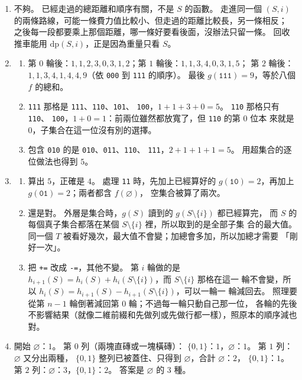 \begin{enumerate}
\item 不夠。 已經走過的總距離和順序有關，不是 $S$ 的函數。 走進同一個
$(S, i)$ 的兩條路線，可能一條費力值比較小、但走過的距離比較長，另一條相反；
之後每一段都要乘上那個距離，哪一條好要看後面，沒辦法只留一條。 回收推車能用
$\mathrm{dp}(S, i)$，正是因為重量只看 $S$。

\item
\begin{enumerate}
\item 第 $0$ 輪後：$1, 1, 2, 3, 0, 3, 1, 2$；第 $1$ 輪後：$1, 1, 3, 4, 0, 3, 1, 5$；
第 $2$ 輪後：$1, 1, 3, 4, 1, 4, 4, 9$（依 \texttt{000} 到 \texttt{111} 的順序）。
最後 $g(\texttt{111}) = 9$，等於八個 $f$ 的總和。
\item \texttt{111} 那格是 \texttt{111}、\texttt{110}、\texttt{101}、
\texttt{100}，$1 + 1 + 3 + 0 = 5$。 \texttt{110} 那格只有 \texttt{110}、
\texttt{100}，$1 + 0 = 1$：前兩位雖然都放寬了，但 \texttt{110} 的第 $0$ 位本
來就是 $0$，子集合在這一位沒有別的選擇。
\item 包含 \texttt{010} 的是 \texttt{010}、\texttt{011}、\texttt{110}、
\texttt{111}，$2 + 1 + 1 + 1 = 5$。 用超集合的逐位做法也得到 $5$。
\end{enumerate}

\item
\begin{enumerate}
\item 算出 $5$，正確是 $4$。 處理 \texttt{11} 時，先加上已經算好的
$g(\texttt{10}) = 2$，再加上 $g(\texttt{01}) = 2$；兩者都含 $f(\varnothing)$，
空集合被算了兩次。
\item 還是對。 外層是集合時，$g(S)$ 讀到的 $g(S \setminus \{i\})$ 都已經算完，
而 $S$ 的每個真子集合都落在某個 $S \setminus \{i\}$ 裡，所以取到的是全部子集
合的最大值。 同一個 $T$ 被看好幾次，最大值不會變；加總會多加，所以加總才需要
「剛好一次」。
\item 把 \texttt{+=} 改成 \texttt{-=}，其他不變。 第 $i$ 輪做的是
$h_{i+1}(S) = h_i(S) + h_i(S \setminus \{i\})$，而 $S \setminus \{i\}$ 那格在這一
輪不會變，所以 $h_i(S) = h_{i+1}(S) - h_{i+1}(S \setminus \{i\})$，可以一輪一
輪減回去。 照理要從第 $n - 1$ 輪倒著減回第 $0$ 輪；不過每一輪只動自己那一位，
各輪的先後不影響結果（就像二維前綴和先做列或先做行都一樣），照原本的順序減也
對。
\end{enumerate}

\item 開始 $\varnothing$：$1$。 第 $0$ 列（兩塊直磚或一塊橫磚）：
$\{0, 1\}$：$1$，$\varnothing$：$1$。 第 $1$ 列：$\varnothing$ 又分出兩種，
$\{0, 1\}$ 整列已被蓋住、只得到 $\varnothing$，合計 $\varnothing$：$2$，
$\{0, 1\}$：$1$。 第 $2$ 列：$\varnothing$：$3$，$\{0, 1\}$：$2$。 答案是
$\varnothing$ 的 $3$ 種。
\end{enumerate}
